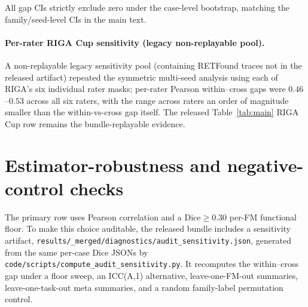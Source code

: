 All gap CIs strictly exclude zero under the case-level bootstrap, matching the family/seed-level CIs in the main text.

\paragraph{Per-rater RIGA Cup sensitivity (legacy non-replayable pool).} A non-replayable legacy sensitivity pool (containing RETFound traces not in the released artifact) repeated the symmetric multi-seed analysis using each of RIGA's six individual rater masks; per-rater Pearson within--cross gaps were $0.46$--$0.53$ across all six raters, with the range across raters an order of magnitude smaller than the within-vs-cross gap itself. The released Table~\ref{tab:main} RIGA Cup row remains the bundle-replayable evidence.

\section{Estimator-robustness and negative-control checks}
\label{app:audit-sensitivity}

The primary row uses Pearson correlation and a Dice${\geq}0.30$ per-FM
functional floor. To make this choice auditable, the released bundle includes a
sensitivity artifact,
\texttt{results/\_merged/diagnostics/audit\_sensitivity.json}, generated from
the same per-case Dice JSONs by
\texttt{code/scripts/compute\_audit\_sensitivity.py}. It recomputes the
within--cross gap under a floor sweep, an ICC(A,1) alternative, leave-one-FM-out
summaries, leave-one-task-out meta summaries, and a random family-label
permutation control.

